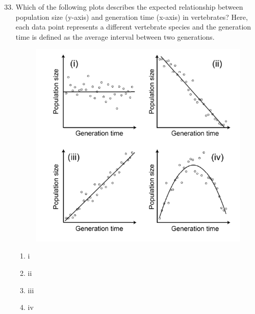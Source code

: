 \documentclass[journal,12pt,onecolumn]{IEEEtran}
\theoremstyle{remark}
\begin{document}
\begin{enumerate}
\setcounter{enumi}{32}

\item Which of the following plots describes the expected relationship between population size (y-axis) and generation time (x-axis) in vertebrates? Here, each data point represents a different vertebrate species and the generation time is defined as the average interval between two generations.
\begin{figure}[h]
    \centering
    \includegraphics[]{figs/33.png}
    \caption{}
    \label{fig:6}
\end{figure}


\begin{multicols}{4}
\begin{enumerate}
\item i
\item ii
\item iii
\item iv
\end{enumerate}
\end{multicols}


\end{enumerate}
\end{document}
